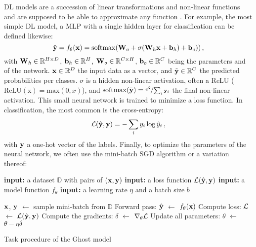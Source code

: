 \ac{DL} models are a succession of linear transformations and non-linear functions and are supposed
to be able to approximate any function . For example, the most simple \ac{DL}
model, a \ac{MLP} with a single hidden layer for classification can be defined likewise:
%
\begin{equation}
      \hat{\mathbf{y}} = f_\theta(\mathbf{x}) = \operatorname{softmax}(\mathbf{W}_o + \sigma(\mathbf{W}_h \mathbf{x} + \mathbf{b}_h) + \mathbf{b}_o))\,,
      \label{eq:intro_mlp}
\end{equation}
%
with $\mathbf{W}_h \in \mathbb{R}^{H \times D}$, $\mathbf{b}_h \in \mathbb{R}^{H}$,
$\mathbf{W}_o \in \mathbb{R}^{C \times H}$, $\mathbf{b}_o \in \mathbb{R}^{C}$ being the parameters and of the
network. $\mathbf{x} \in \mathbb{R}^D$ the input data as a vector, and $\tilde{\mathbf{y}} \in \mathbb{R}^C$ the
predicted probabilities per classes. $\sigma$ is a hidden non-linear activation, often a \ac{ReLU}
($\operatorname{ReLU(x)} = \text{max}(0, x)$), and $\operatorname{softmax}(\tilde{\mathbf{y}}) =
      \nicefrac{e^{\tilde{\mathbf{y}}}}{\sum_{i} \tilde{\mathbf{y}}_i}$ the final non-linear activation. This small
neural network is trained to minimize a loss function. In classification, the most common is the
cross-entropy:
%
\begin{equation}
      \mathcal{L}(\hat{\mathbf{y}}, \mathbf{y}) = -\sum_i y_i \log \hat{y}_i\,,
      \label{eq:intro_ce}
\end{equation}
%
with $\mathbf{y}$ a one-hot vector of the labels. Finally, to optimize the parameters of the neural
network, we often use the mini-batch \ac{SGD} algorithm or a variation thereof:

\begin{algorithm}
      \begin{algorithmic}[1]
            \Statex \textbf{input:} a dataset $\mathbb{D}$ with pairs of $(\mathbf{x}, \mathbf{y})$
            \Statex \textbf{input:} a loss function $\mathcal{L}(\hat{\mathbf{y}}, \mathbf{y})$
            \Statex \textbf{input:} a model function $f_\theta$
            \Statex \textbf{input:} a learning rate $\eta$ and a batch size $b$
            \Statex

            \State $\mathbf{x}$, $\mathbf{y}$ $\gets$ sample mini-batch from $\mathbb{D}$
            \State Forward pass: $\hat{\mathbf{y}}$ $\gets$ $f_\theta(\mathbf{x})$
            \State Compute loss: $\mathcal{L}$ $\gets$ $\mathcal{L}(\hat{\mathbf{y}}, \mathbf{y})$
            \State Compute the gradients: $\delta$ $\gets$ $\nabla_\theta \mathcal{L}$
            \State Update all parameters: $\theta$ $\gets$ $\theta - \eta \delta$
            \EndWhile
      \end{algorithmic}
      \caption{Task procedure of the Ghost model}
      \label{algo:intro_sgd}
\end{algorithm}


